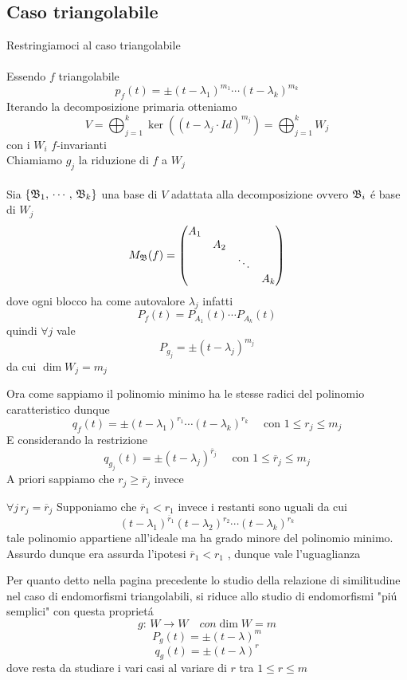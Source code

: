 \newpage

\subsection{Caso triangolabile}
Restringiamoci al caso triangolabile  \\ \\
Essendo $f$ triangolabile 
$$ p_f(t) =\pm ( t-\lambda_1) ^{m_1} \cdots ( t-\lambda_k)^{m_k} $$
Iterando la decomposizione primaria otteniamo 
$$ V=\bigoplus_{j=1}^k \ker ( (t-\lambda_j \cdot Id)^{m_j} ) = \bigoplus_{j=1}^kW_j$$
con i $W_i$ $f$-invarianti\\
Chiamiamo $g_j$ la riduzione di $f$ a $W_j$ \\ \\
Sia $\{ \mathfrak{B}_1 ,\, \cdots , \, \mathfrak{B}_k \} $ una base di $V$ adattata alla decomposizione ovvero $\mathfrak{B}_i $ \'e base di $W_j$
$$ M_{\mathfrak{B}}(f) =\begin{pmatrix}
A_1 \\
 & A_2 \\
 & & \ddots \\
 & & & A_k 
\end{pmatrix}$$
dove ogni blocco ha come autovalore $\lambda_j$ infatti
$$ P_f(t)=P_{A_1}(t) \cdots  P_{A_k} (t) $$
quindi $\forall j $ vale
$$ P_{g_j} = \pm ( t-\lambda_j) ^{ m_j} $$
da cui $\dim W_j=m_j $

Ora come sappiamo il polinomio minimo ha le stesse radici del polinomio caratteristico dunque
$$ q_f(t) =\pm ( t-\lambda_1) ^{r_1} \cdots ( t-\lambda_k)^{r_k}  \quad \text{  con }  1\leq r_j \leq m_j $$
E considerando la restrizione
$$ q_{g_j}(t) =\pm ( t-\lambda_j) ^{\overline{r}_j} \quad \text{ con } 1 \leq \overline{r}_j \leq m_j$$
A priori  sappiamo che $r_j\geq \overline{r}_j $ invece 
\begin{prop} $\forall j \, r_j=\overline{r}_j $
\proof
Supponiamo che $ \overline{r}_1 < r_1 $ invece i restanti sono uguali da cui
$$ (t-\lambda_1 )^{\overline{r}_1 } (t -\lambda_2)^{r_2} \cdots ( t- \lambda_k ) ^{r_k} $$ tale polinomio appartiene all'ideale ma ha grado minore del polinomio minimo.\\
Assurdo dunque era assurda l'ipotesi $ \overline{r}_1 < r_1 $ , dunque vale l'uguaglianza
\endproof
\end{prop}
\newpage
Per quanto detto nella pagina precedente lo studio della relazione di similitudine nel caso di endomorfismi triangolabili, si riduce allo studio di endomorfismi "pi\'u semplici" con questa propriet\'a 
$$ g:\, W \to W  \quad con \dim W=m $$
$$ P_g(t)=\pm ( t-\lambda)^m $$
$$ q_g(t)=\pm (t-\lambda)^r$$
dove resta da studiare i vari casi al variare di  $r$ tra $1 \leq r \leq m $ \\ \\

